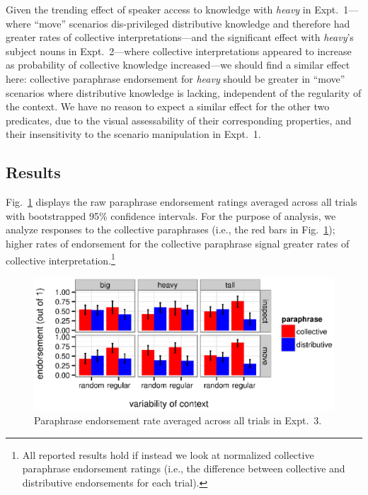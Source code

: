 \documentclass[linguex]{sp}
\begin{document}
Given the trending effect of speaker access to knowledge with \emph{heavy} in Expt.~1---where ``move'' scenarios dis-privileged distributive knowledge and therefore had greater rates of collective interpretations---and the significant effect with \emph{heavy}'s subject nouns in Expt.~2---where collective interpretations appeared to increase as probability of collective knowledge increased---we should find a similar effect here: collective paraphrase endorsement for \emph{heavy} should be greater in ``move'' scenarios where distributive knowledge is lacking, independent of the regularity of the context. We have no reason to expect a similar effect for the other two predicates, due to the visual assessability of their corresponding properties, and their insensitivity to the scenario manipulation in Expt.~1.

\subsection{Results}

Fig.\ \ref{resultsexpt2} displays the raw paraphrase endorsement ratings averaged across all trials with bootstrapped 95\% confidence intervals. For the purpose of analysis, we analyze responses to the collective paraphrases (i.e., the red bars in Fig.~\ref{resultsexpt2}); higher rates of endorsement for the collective paraphrase signal greater rates of collective interpretation.\footnote{All reported results hold if instead we look at normalized collective paraphrase endorsement ratings (i.e., the difference between collective and distributive endorsements for each trial).} %

\begin{figure}[h!]
	\centering
	\includegraphics[width=\linewidth]{plots/expt2rawbootsci2.eps} 
	\vspace{-15pt}
	\caption{Paraphrase endorsement rate averaged across all trials in Expt.~3.}\label{resultsexpt2}
\end{figure}
\end{document}
